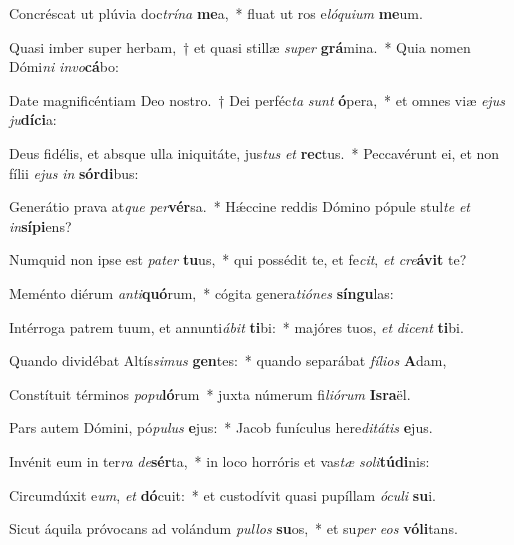 \item Concréscat ut plúvia doc\textit{trí}\textit{na} \textbf{me}a,~* fluat ut ros e\textit{ló}\textit{qui}\textit{um} \textbf{me}um.
\item Quasi imber super herbam,~† et quasi stillæ \textit{su}\textit{per} \textbf{grá}mina.~* Quia nomen Dómi\textit{ni} \textit{in}\textit{vo}\textbf{cá}bo:
\item Date magnificéntiam Deo nostro.~† Dei perféc\textit{ta} \textit{sunt} \textbf{ó}pera,~* et omnes viæ \textit{e}\textit{jus} \textit{ju}\textbf{dí}\textbf{ci}a:
\item Deus fidélis, et absque ulla iniquitáte, jus\textit{tus} \textit{et} \textbf{rec}tus.~* Peccavérunt ei, et non fílii \textit{e}\textit{jus} \textit{in} \textbf{sór}\textbf{di}bus:
\item Generátio prava at\textit{que} \textit{per}\textbf{vér}sa.~* Hǽccine reddis Dómino pópule stul\textit{te} \textit{et} \textit{in}\textbf{sí}\textbf{pi}ens?
\item Numquid non ipse est \textit{pa}\textit{ter} \textbf{tu}us,~* qui possédit te, et fe\textit{cit}, \textit{et} \textit{cre}\textbf{á}\textbf{vit} te?
\item Meménto diérum \textit{an}\textit{ti}\textbf{quó}rum,~* cógita genera\textit{ti}\textit{ó}\textit{nes} \textbf{sín}\textbf{gu}las:
\item Intérroga patrem tuum, et annunti\textit{á}\textit{bit} \textbf{ti}bi:~* majóres tuos, \textit{et} \textit{di}\textit{cent} \textbf{ti}bi.
\item Quando dividébat Altís\textit{si}\textit{mus} \textbf{gen}tes:~* quando separábat \textit{fí}\textit{li}\textit{os} \textbf{A}dam,
\item Constítuit términos \textit{po}\textit{pu}\textbf{ló}rum~* juxta númerum fi\textit{li}\textit{ó}\textit{rum} \textbf{Is}\textbf{ra}ël.
\item Pars autem Dómini, pó\textit{pu}\textit{lus} \textbf{e}jus:~* Jacob funículus here\textit{di}\textit{tá}\textit{tis} \textbf{e}jus.
\item Invénit eum in ter\textit{ra} \textit{de}\textbf{sér}ta,~* in loco horróris et vas\textit{tæ} \textit{so}\textit{li}\textbf{tú}\textbf{di}nis:
\item Circumdúxit e\textit{um}, \textit{et} \textbf{dó}cuit:~* et custodívit quasi pupíllam \textit{ó}\textit{cu}\textit{li} \textbf{su}i.
\item Sicut áquila próvocans ad volándum \textit{pul}\textit{los} \textbf{su}os,~* et su\textit{per} \textit{e}\textit{os} \textbf{vó}\textbf{li}tans.
